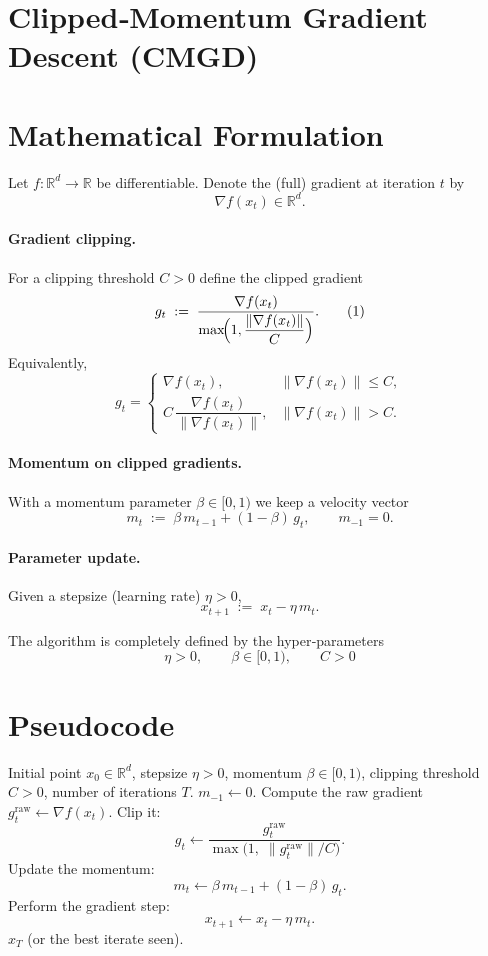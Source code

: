 \documentclass{article}
\newcommand{\R}{\mathbb{R}}
\begin{document}
\section*{Clipped‑Momentum Gradient Descent (CMGD)}

\section*{Mathematical Formulation}
Let $f:\R^{d}\rightarrow\R$ be differentiable.  
Denote the (full) gradient at iteration $t$ by
\[
\nabla f(x_t)\in\R^{d}.
\]

\paragraph{Gradient clipping.}
For a clipping threshold $C>0$ define the clipped gradient
\[
g_t \;:=\; \frac{\nabla f(x_t)}{\displaystyle \max\!\Bigl(1,\frac{\|\nabla f(x_t)\|}{C}\Bigr)}.
\tag{1}
\]
Equivalently,
\[
g_t=\begin{cases}
\nabla f(x_t), & \|\nabla f(x_t)\|\le C,\\[4pt]
C\,\dfrac{\nabla f(x_t)}{\|\nabla f(x_t)\|}, & \|\nabla f(x_t)\|>C .
\end{cases}
\tag{2}
\]

\paragraph{Momentum on clipped gradients.}
With a momentum parameter $\beta\in[0,1)$ we keep a velocity vector
\[
m_t \;:=\; \beta\, m_{t-1} + (1-\beta)\, g_t, \qquad m_{-1}=0.
\tag{3}
\]

\paragraph{Parameter update.}
Given a stepsize (learning rate) $\eta>0$,
\[
x_{t+1}\;:=\; x_t - \eta\, m_t .
\tag{4}
\]

The algorithm is completely defined by the hyper‑parameters
\[
\boxed{\; \eta>0,\qquad \beta\in[0,1),\qquad C>0 \;}
\]

\section*{Pseudocode}
\begin{algorithm}[H]
\caption{Clipped‑Momentum Gradient Descent}
\begin{algorithmic}[1]
\Require Initial point $x_0\in\R^{d}$, stepsize $\eta>0$, momentum $\beta\in[0,1)$, clipping threshold $C>0$, number of iterations $T$.
\State $m_{-1}\gets 0$.
    \State Compute the raw gradient $g^{\text{raw}}_t\gets \nabla f(x_t)$.
    \State Clip it:
    \[
    g_t \gets \frac{g^{\text{raw}}_t}{\max\!\bigl(1,\; \|g^{\text{raw}}_t\|/C\bigr)} .
    \]   
    \State Update the momentum:
    \[
    m_t \gets \beta\, m_{t-1} + (1-\beta)\, g_t .
    \]   
    \State Perform the gradient step:
    \[
    x_{t+1} \gets x_t - \eta\, m_t .
    \]   
\EndFor
\State \Return $x_T$ (or the best iterate seen).
\end{algorithmic}
\end{algorithm}
\end{document}
